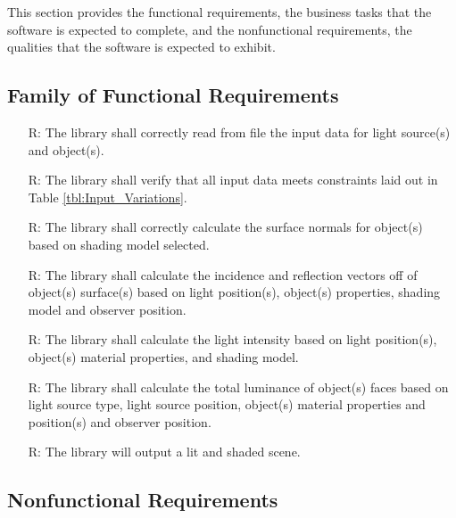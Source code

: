 \documentclass[12pt]{article}
\newcounter{reqnum} %
\begin{document}
This section provides the functional requirements, the business tasks that the
software is expected to complete, and the nonfunctional requirements, the
qualities that the software is expected to exhibit.

\subsection{Family of Functional Requirements}

\noindent \begin{itemize}

\item[R\refstepcounter{reqnum}\thereqnum \label{R_Inputs1}:] The library shall  
correctly read from file the input data for light source(s) and object(s).
\item[R\refstepcounter{reqnum}\thereqnum \label{R_Inputs2}:]The library shall 
verify that all input data meets constraints laid out in Table 
\ref{tbl:Input_Variations}.
\item[R\refstepcounter{reqnum}\thereqnum \label{R_Calculate1}:] The library 
shall correctly calculate the surface normals for object(s) based on shading 
model selected. 
\item[R\refstepcounter{reqnum}\thereqnum \label{R_Calculate2}:] The library 
shall calculate the incidence and reflection vectors off of object(s) 
surface(s) based on light position(s), object(s) properties, shading model and 
observer position.
\item[R\refstepcounter{reqnum}\thereqnum \label{R_Calculate3}:] The library 
shall calculate the light intensity based on light position(s), object(s) 
material properties, and shading model.
\item[R\refstepcounter{reqnum}\thereqnum \label{R_Calculate4}:] The library 
shall calculate the total luminance of object(s) faces based on light source 
type, light source position, object(s) material properties and position(s) and 
observer position.
\item[R\refstepcounter{reqnum}\thereqnum \label{R_Output}:] The library 
will output a lit and shaded scene.

\end{itemize}

\subsection{Nonfunctional Requirements}
\end{document}
